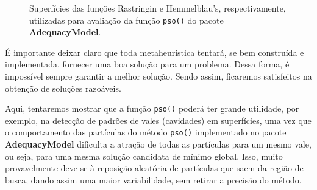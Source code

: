 \documentclass[10pt,letterpaper]{article}
\begin{document}
\begin{figure}[H]
	\centering
	
	\caption{Superfícies das funções Rastringin e Hemmelblau's, respectivamente, utilizadas para avaliação da função \texttt{pso()} do pacote \textbf{AdequacyModel}.}
\end{figure}


É importante deixar claro que toda metaheurística tentará, se bem construída e implementada, fornecer uma boa solução para um problema. Dessa forma, é impossível sempre garantir a melhor solução. Sendo assim, ficaremos satisfeitos na obtenção de soluções razoáveis. 

Aqui, tentaremos mostrar que a função \texttt{pso()} poderá ter grande utilidade, por exemplo, na detecção de padrões de vales (cavidades) em superfícies, uma vez que o comportamento das partículas do método \texttt{pso()} implementado no pacote \textbf{AdequacyModel} dificulta a atração de todas as partículas para um mesmo vale, ou seja, para uma mesma solução candidata de mínimo global. Isso, muito provavelmente deve-se à reposição aleatória de partículas que saem da região de busca, dando assim uma maior variabilidade, sem retirar a precisão do método.
 
\end{document}

